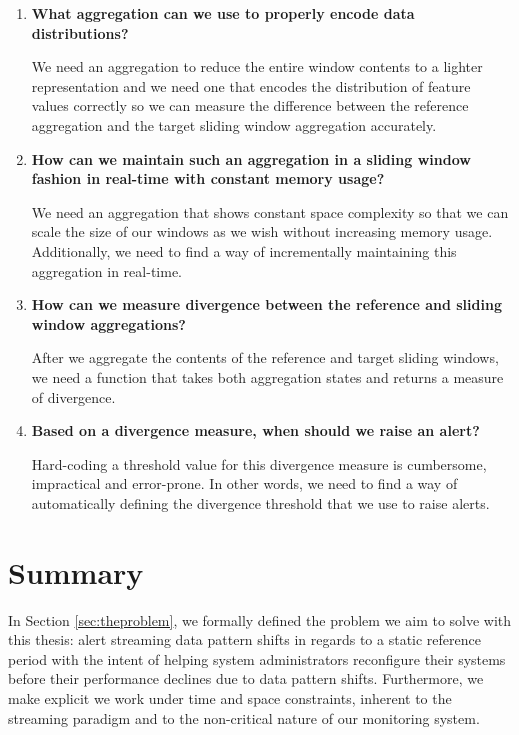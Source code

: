 \begin{enumerate}[leftmargin=1.6cm, label=\textbf{(RQ\arabic*)}]
    \item \textbf{What aggregation can we use to properly encode data distributions?}
    
    We need an aggregation to reduce the entire window contents to a lighter representation and we need one that encodes the distribution of feature values correctly so we can measure the difference between the reference aggregation and the target sliding window aggregation accurately.
    
    \item \textbf{How can we maintain such an aggregation in a sliding window fashion in real-time with constant memory usage?}
    
    We need an aggregation that shows constant space complexity so that we can scale the size of our windows as we wish without increasing memory usage. Additionally, we need to find a way of incrementally maintaining this aggregation in real-time.
    
    
    \item \textbf{How can we measure divergence between the reference and sliding window aggregations?}
    
    After we aggregate the contents of the reference and target sliding windows, we need a function that takes both aggregation states and returns a measure of divergence.
    
    \item \textbf{Based on a divergence measure, when should we raise an alert?}
    
    Hard-coding a threshold value for this divergence measure is cumbersome, impractical and error-prone. In other words, we need to find a way of automatically defining the divergence threshold that we use to raise alerts. 
    
\end{enumerate}


\section{Summary}
In Section \ref{sec:theproblem}, we formally defined the problem we aim to solve with this thesis: alert streaming data pattern shifts in regards to a static reference period with the intent of helping system administrators reconfigure their systems before their performance declines due to data pattern shifts. Furthermore, we make explicit we work under time and space constraints, inherent to the streaming paradigm and to the non-critical nature of our monitoring system.


